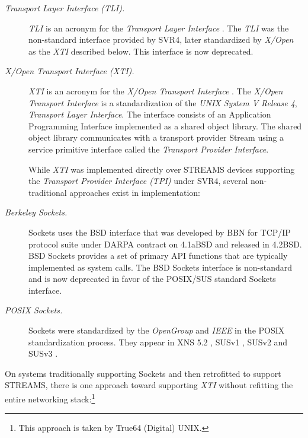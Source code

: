 \documentclass[letterpaper,final,notitlepage,twocolumn,10pt,twoside]{article}
\begin{document}
\begin{description}

\item[{\it Transport Layer Interface (TLI).}]

\textsl{TLI} is an acronym for the \textit{Transport Layer Interface}
\cite[]{tli}.  The \textsl{TLI} was the non-standard interface provided by
SVR4, later standardized by \textit{X/Open} as the \textsl{XTI} described
below.  This interface is now deprecated.

\item[{\it X/Open Transport Interface (XTI).}]

\textsl{XTI} is an acronym for the \textsl{X/Open Transport Interface}
\cite[]{xti}.  The \textsl{X/Open Transport Interface} is a standardization of
the \textsl{UNIX System V Release 4}, \textsl{Transport Layer Interface}.  The
interface consists of an Application Programming Interface implemented as a
shared object library.  The shared object library communicates with a
transport provider Stream using a service primitive interface called the
\textsl{Transport Provider Interface}.

While \textsl{XTI} was implemented directly over STREAMS devices supporting
the \textit{Transport Provider Interface (TPI)} \cite[]{tpi} under SVR4,
several non-traditional approaches exist in implementation:

\item[{\it Berkeley Sockets.}]

Sockets uses the BSD interface that was developed by BBN for TCP/IP protocol
suite under DARPA contract on 4.1aBSD and released in 4.2BSD.  BSD Sockets
provides a set of primary API functions that are typically implemented as
system calls.  The BSD Sockets interface is non-standard and is now
deprecated in favor of the POSIX/SUS standard Sockets interface.

\item[{\it POSIX Sockets.}]

Sockets were standardized by the \textit{OpenGroup} \cite[]{opengroup} and
\textit{IEEE} in the POSIX standardization process.  They appear in XNS 5.2
\cite[]{xns}, SUSv1 \cite[]{susv1}, SUSv2 \cite[]{susv2} and SUSv3
\cite[]{susv3}.

\end{description}

On systems traditionally supporting Sockets and then retrofitted to support
STREAMS, there is one approach toward supporting \textsl{XTI} without
refitting the entire networking stack:\footnote{This approach is taken by
True64 (Digital) UNIX.}
\end{document}
